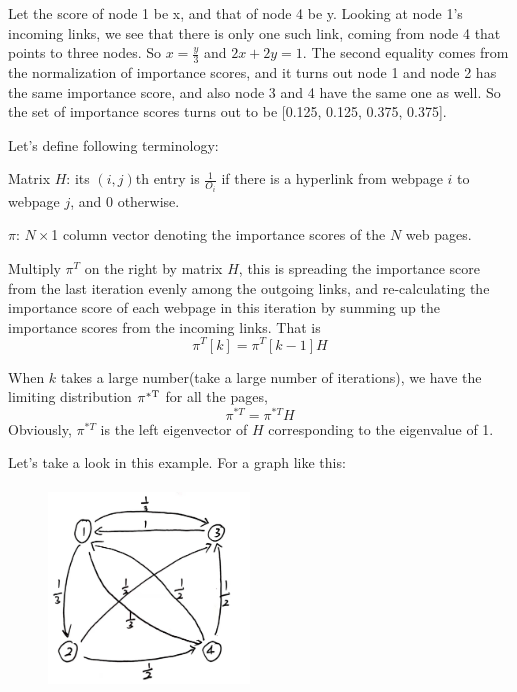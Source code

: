 Let the score of node 1 be x, and that of node 4 be y. Looking at node 1's incoming links, we see that there is only one such link, coming from node 4 that points to three nodes. So $x = \frac{y}{3}$ and $2x + 2y = 1$. The second equality comes from the normalization of importance scores, and it turns out node 1 and node 2 has the same importance score, and also node 3 and 4 have the same one as well. So the set of importance scores turns out to be [0.125, 0.125, 0.375, 0.375]. 

Let's define following terminology:

Matrix $H$: its $(i,j)$th entry is $\frac{1}{O_i}$ if there is a hyperlink from webpage $i$ to webpage $j$, and $0$ otherwise.

$\pi$: $N \times$1 column vector denoting the importance scores of the $N$ web pages.

Multiply $\pi^T$ on the right by matrix $H$, this is spreading the importance score from the last iteration evenly among the outgoing links, and re-calculating the importance score of each webpage in this iteration by summing up the importance scores from the incoming links. That is
$$\pi^T[k] = \pi^T[k - 1]H$$



When $k$ takes a large number(take a large number of iterations), we have the limiting distribution $\pi^{*{\rm T}}$ for all the pages,
$$\pi^{*T} = \pi^{*T}H$$
Obviously, $\pi^{*T}$ is the left eigenvector of $H$ corresponding to the eigenvalue of 1.


Let's take a look in this example. For a graph like this:

\begin{figure}
	\centering
	\includegraphics[width=2.1in,height=2.1in]{figures/ch03/figure3.jpg}
\end{figure}

